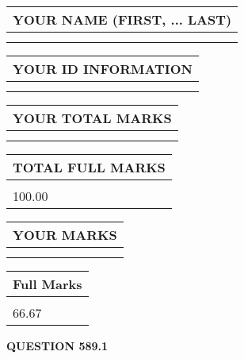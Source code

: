 \documentclass{ctexart}
\begin{document}
   
   
   
\newpage 
\setcounter{page}{ 
   589001 } 
   
   
   
   
\noindent\begin{tabular}{|l|}
\hline
YOUR NAME (FIRST, ... LAST)  \\
\hline
 \\ 
 \\ 
\hline
\end{tabular}
\hspace{0.05in} \begin{tabular}{|l|}
\hline
 YOUR   ID   INFORMATION  \\
\hline
 \\ 
 \\ 
\hline
\end{tabular}
   
   
\vspace{0.2in}\noindent\begin{tabular}{|l|}
\hline
YOUR TOTAL MARKS  \\
\hline
 \\ 
 \\ 
\hline
\end{tabular}
\hspace{0.05in} \begin{tabular}{|l|}
\hline
TOTAL FULL MARKS  \\
\hline
 \\ 
100.00 \\
\hline
\end{tabular}
   
   
 \vspace{0.2in}
 
 
 
 
   
   
  
\vspace{0.2in}
  
\noindent\begin{tabular}{|l|}
\hline
 YOUR MARKS  \\
\hline
 \\ 
 \\ 
\hline
\end{tabular}
\hspace{0.05in} \begin{tabular}{|l|}
\hline
 Full Marks  \\
\hline
 \\ 
66.67 \\
\hline
\end{tabular}
{\textbf{\Large{QUESTION
589.1 
}}}
  
\end{document}
